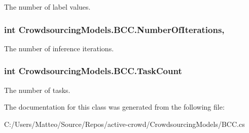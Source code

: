 The number of label values. 

\hypertarget{class_crowdsourcing_models_1_1_b_c_c_aa5cce09f39a4144782ac97f490747792}{}
\subsubsection[{Number\+Of\+Iterations}]{\setlength{\rightskip}{0pt plus 5cm}int Crowdsourcing\+Models.\+B\+C\+C.\+Number\+Of\+Iterations\hspace{0.3cm}{\ttfamily [get]}, {\ttfamily [set]}}\label{class_crowdsourcing_models_1_1_b_c_c_aa5cce09f39a4144782ac97f490747792}


The number of inference iterations. 

\hypertarget{class_crowdsourcing_models_1_1_b_c_c_a79d1a31d02990f09b9b88eff57ad1920}{}
\subsubsection[{Task\+Count}]{\setlength{\rightskip}{0pt plus 5cm}int Crowdsourcing\+Models.\+B\+C\+C.\+Task\+Count\hspace{0.3cm}{\ttfamily [get]}}\label{class_crowdsourcing_models_1_1_b_c_c_a79d1a31d02990f09b9b88eff57ad1920}


The number of tasks. 



The documentation for this class was generated from the following file\+:\begin{DoxyCompactItemize}
\item 
C\+:/\+Users/\+Matteo/\+Source/\+Repos/active-\/crowd/\+Crowdsourcing\+Models/B\+C\+C.\+cs\end{DoxyCompactItemize}
